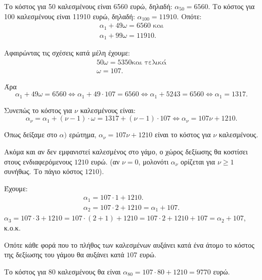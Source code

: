 
\begin{alist}
\item Το κόστος για 50 καλεσμένους είναι 6560 ευρώ, δηλαδή:
$\alpha_{50} = 6560$.
Το κόστος για 100 καλεσμένους είναι 11910 ευρώ, δηλαδή:
$\alpha_{100} = 11910$.
Οπότε:
\begin{gather*}
\alpha_1 + 49\omega = 6560\text{ και} \\
\alpha_1 + 99\omega = 11910.
\end{gather*}

Αφαιρώντας τις σχέσεις κατά μέλη έχουμε:
\begin{gather*}
50\omega = 5350\text{και τελικά} \\
\omega = 107.
\end{gather*}

Άρα
\[\alpha_1 + 49\omega = 6560 \Leftrightarrow \alpha_1 + 49 \cdot 107 = 6560 \Leftrightarrow \alpha_1 + 5243 = 6560 \Leftrightarrow \alpha_1 = 1317.\]

Συνεπώς το κόστος για $\nu$ καλεσμένους είναι:
\[\alpha_\nu = \alpha_1 + (\nu - 1) \cdot \omega = 1317 + (\nu - 1) \cdot 107 \Leftrightarrow \alpha_\nu = 107\nu + 1210.\]

\item 
\begin{rlist}
\item Όπως δείξαμε στο $\alpha)$ ερώτημα, $\alpha_\nu = 107\nu + 1210$ είναι το κόστος για $\nu$ καλεσμένους.

Ακόμα και αν δεν εμφανιστεί καλεσμένος στο γάμο, ο χώρος δεξίωσης θα κοστίσει στους
ενδιαφερόμενους $1210$ ευρώ. (αν $\nu=0$, μολονότι $\alpha_\nu$ ορίζεται για $\nu \ge 1$ συνήθως. Το πάγιο κόστος $1210$).

\item Έχουμε:
\begin{gather*}
\alpha_1 = 107 \cdot 1 + 1210. \\
\alpha_2 = 107 \cdot 2 + 1210 = \alpha_1 + 107.
\end{gather*}
$\alpha_3 = 107 \cdot 3 + 1210 = 107 \cdot (2 + 1) + 1210 = 107 \cdot 2 + 1210 + 107 = \alpha_2 + 107$,  κ.ο.κ.

Οπότε κάθε φορά που το πλήθος των καλεσμένων αυξάνει κατά ένα άτομο το κόστος της
δεξίωσης του γάμου θα αυξάνει κατά $107$ ευρώ.
\end{rlist}

\item Το κόστος για 80 καλεσμένους θα είναι $\alpha_{80} = 107 \cdot 80 + 1210 = 9770$ ευρώ.
\end{alist}

